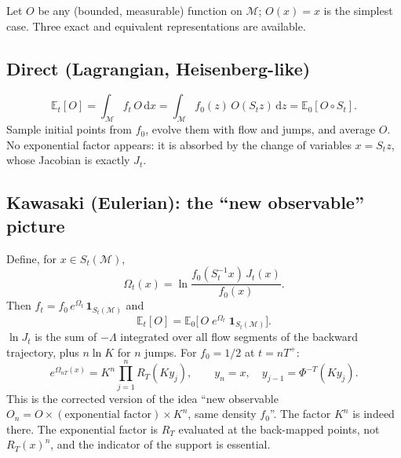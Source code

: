 \documentclass[11pt,a4paper]{article}
\theoremstyle{remark}
\newcommand{\E}{\mathbb{E}}
\newcommand{\M}{\mathcal{M}}
\newcommand{\one}{\mathbf{1}}
\newcommand{\dd}{\mathrm{d}}
\begin{document}
Let $O$ be any (bounded, measurable) function on $\M$; $O(x)=x$ is the
simplest case. Three exact and equivalent representations are available.

\subsection{Direct (Lagrangian, Heisenberg-like)}
\begin{equation}\label{eq:direct}
  \E_t[O] = \int_\M f_t\,O\,\dd x = \int_\M f_0(z)\, O(S_t z)\,\dd z
  = \E_0[O\circ S_t] .
\end{equation}
Sample initial points from $f_0$, evolve them with flow and jumps, and average
$O$. No exponential factor appears: it is absorbed by the change of variables
$x=S_t z$, whose Jacobian is exactly $J_t$.

\subsection{Kawasaki (Eulerian): the ``new observable'' picture}
Define, for $x\in S_t(\M)$,
\begin{equation}
  \Omega_t(x) = \ln\frac{f_0(S_t^{-1}x)\,J_t(x)}{f_0(x)} .
\end{equation}
Then $f_t = f_0\,e^{\Omega_t}\,\one_{S_t(\M)}$ and
\begin{equation}\label{eq:kawasaki}
  \E_t[O] = \E_0\big[\,O\; e^{\Omega_t}\;\one_{S_t(\M)}\big].
\end{equation}
$\ln J_t$ is the sum of $-\Lambda$ integrated over all flow segments of the
backward trajectory, plus $n\ln K$ for $n$ jumps. For $f_0=1/2$ at $t=nT^+$:
\begin{equation}
  e^{\Omega_{nT}(x)} = K^n \prod_{j=1}^n R_T(K y_j),\qquad
  y_n = x,\quad y_{j-1}=\Phi^{-T}(K y_j).
\end{equation}
This is the corrected version of the idea ``new observable
$O_n = O\times(\text{exponential factor})\times K^n$, same density $f_0$''.
The factor $K^n$ is indeed there. The exponential factor is $R_T$ evaluated at
the back-mapped points, not $R_T(x)^n$, and the indicator of the support is
essential.
\end{document}

